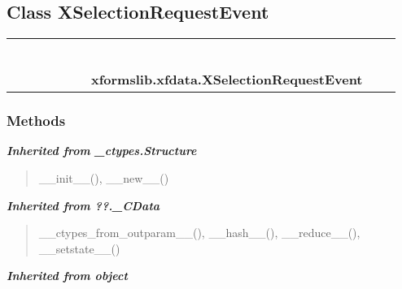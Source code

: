 \subsection{Class XSelectionRequestEvent}

    \label{xformslib:xfdata:XSelectionRequestEvent}
\begin{tabular}{cccccccccc}
\multicolumn{2}{r}{\settowidth{\BCL}{object}\multirow{2}{\BCL}{object}}
&&
&&
&&
  \\\cline{3-3}
  &&\multicolumn{1}{c|}{}
&&
&&
&&
  \\
\multicolumn{4}{r}{\settowidth{\BCL}{??.\_CData}\multirow{2}{\BCL}{??.\_CData}}
&&
&&
  \\\cline{5-5}
  &&&&\multicolumn{1}{c|}{}
&&
&&
  \\
\multicolumn{6}{r}{\settowidth{\BCL}{\_ctypes.Structure}\multirow{2}{\BCL}{\_ctypes.Structure}}
&&
  \\\cline{7-7}
  &&&&&&\multicolumn{1}{c|}{}
&&
  \\
&&&&&&\multicolumn{2}{l}{\textbf{xformslib.xfdata.XSelectionRequestEvent}}
\end{tabular}



  \subsubsection{Methods}


\large{\textbf{\textit{Inherited from \_ctypes.Structure}}}

\begin{quote}
\_\_init\_\_(), \_\_new\_\_()
\end{quote}

\large{\textbf{\textit{Inherited from ??.\_CData}}}

\begin{quote}
\_\_ctypes\_from\_outparam\_\_(), \_\_hash\_\_(), \_\_reduce\_\_(), \_\_setstate\_\_()
\end{quote}

\large{\textbf{\textit{Inherited from object}}}

